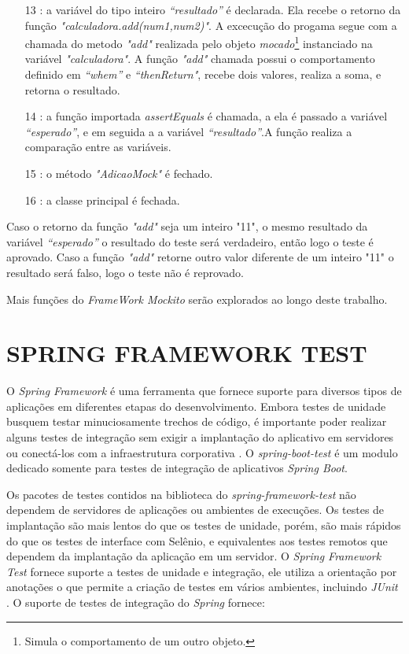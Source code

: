 \begin{itemize}
\item[13]: a variável do tipo inteiro \textit{“resultado”} é declarada. Ela recebe o retorno da função \textit{"calculadora.add(num1,num2)"}. A excecução do progama segue com a chamada do metodo  \textit{"add"} realizada pelo objeto \textit{mocado}\footnote{Simula o comportamento de um outro objeto.} instanciado na variável \textit{"calculadora"}. A função \textit{"add"} chamada possui o comportamento definido em \textit{“whem”} e \textit{“thenReturn"}, recebe dois valores, realiza a soma, e retorna o resultado.

\item[14]: a função importada \textit{assertEquals} é chamada, a ela é passado a variável \textit{“esperado”}, e em seguida a a variável \textit{“resultado”}.A função realiza a comparação entre as variáveis.

\item[15]: o método \textit{"AdicaoMock"} é fechado.

\item[16]: a classe principal é fechada.

\end{itemize}

Caso o retorno da função \textit{"add"} seja um inteiro "11", o mesmo resultado da variável \textit{“esperado”} o resultado do teste será verdadeiro, então logo o teste é aprovado. Caso a função \textit{"add"}  retorne outro valor diferente de um inteiro "11"  o resultado será falso, logo o teste não é reprovado. 


    Mais funções do \textit{FrameWork Mockito} serão explorados ao longo deste trabalho.

\section{SPRING FRAMEWORK TEST}

O \textit{Spring Framework} é uma ferramenta que fornece suporte para diversos tipos de aplicações em diferentes etapas do desenvolvimento. Embora testes de unidade busquem testar minuciosamente trechos de código, é importante poder realizar alguns testes de integração sem exigir a implantação do aplicativo em  servidores ou conectá-los com a infraestrutura corporativa \cite{spring}. O \textit{spring-boot-test} é um modulo dedicado somente para testes de integração de aplicativos \textit{Spring Boot}.


Os pacotes de testes contidos na biblioteca do \textit{spring-framework-test} não dependem de servidores de aplicações ou ambientes de execuções. Os testes de implantação são mais lentos do que os testes de unidade, porém, são mais rápidos do que os testes de  interface com Selênio, e equivalentes aos testes remotos que dependem da implantação da aplicação em um servidor. O \textit{Spring Framework Test} fornece suporte a testes de unidade e integração, ele utiliza a orientação por anotações o que permite a criação de testes em vários ambientes, incluindo \textit{JUnit} \cite{spring}. O suporte de testes de integração do \textit{Spring} fornece: 

